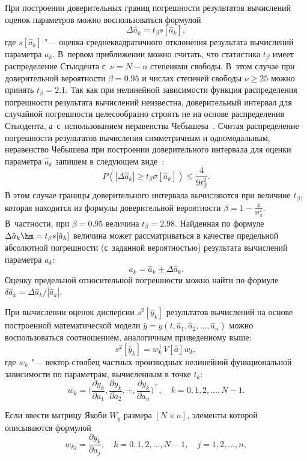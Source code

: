 При построении доверительных границ погрешности результатов вычислений оценок параметров   можно воспользоваться формулой 
$$\Delta\hat{a}_k=t_\beta s[\hat{a}_k],$$ 
где $s[\hat{a}_k]$ "--- оценка среднеквадратичного отклонения результата вычислений параметра $a_k$. 
В~первом приближении можно считать, что статистика $t_\beta$ имеет распределение Стьюдента с~$\nu=N-n$ степенями свободы. 
В~этом случае при доверительной вероятности $\beta=0.95$ и числах степеней свободы $\nu \geq 25$ можно принять $t_\beta=2.1$. 
Так как при нелинейной зависимости функция распределения погрешности результата вычислений неизвестна,  доверительный интервал для случайной погрешности целесообразно строить не на основе распределения Стьюдента, а~с~использованием неравенства Чебышева~\cite{zot:7}. 
Считая распределение погрешности результатов вычисления симметричным и одномодальным, неравенство Чебышева при построении доверительного интервала для оценки параметра $\hat{a}_k$ запишем в следующем виде~\cite{zot:7}: 
$$
P(|\Delta\hat{a}_k|\geq t_\beta \sigma[\hat{a}_k])\leq \dfrac{4}{9t_\beta^2}.
$$ 
В этом случае границы доверительного интервала вычисляются при величине $t_\beta$, которая находится из формулы доверительной вероятности $\beta=1-\frac{4}{9t_\beta^2}$. 
В~частности, при $\beta=0.95$ величина $t_\beta=2.98$. Найденная по формуле $\Delta\hat{a}_k \hm =t_\beta s[\hat{a}_k]$ величина может рассматриваться в качестве предельной абсолютной погрешности (с~заданной вероятностью) результата вычислений параметра $a_k$: 
$$a_k=\hat{a}_k\pm \Delta\hat{a}_k.$$ Оценку предельной относительной погрешности можно найти по формуле $\delta\hat{a}_k={\Delta \hat{a}_k}/{|\hat{a}_k|}.$

При вычислении оценок дисперсии $s^2[\hat{y}_k]$  результатов вычислений на основе построенной математической модели $\hat{y}=y(t,\hat{a}_1,\hat{a}_2,\dots,\hat{a}_n)$ можно воспользоваться соотношением, аналогичным приведенному выше: 
$$s^2[\hat{y}_k]=w_k^{\top}V[\hat{a}]w_k,$$ 
где $w_k$ "--- вектор-столбец частных производных нелинейной функциональной зависимости по параметрам, вычисленным в точке $t_k$:
$$w_k=\Big(\dfrac{\partial y_k}{\partial a_1},\dfrac{\partial y_k}{\partial a_2},\cdots,\dfrac{\partial y_k}{\partial a_n}\Big)^{\top},\quad k=0,1,2,\dots,N-1.$$



Если ввести матрицу Якоби $W_y$ размера $[N \times n]$, элементы которой описываются формулой 
$$
w_{kj}=\dfrac{\partial y_k}{\partial a_j},\quad k=0,1,2,\dots,N-1,\quad j=1,2,\dots,n,
$$ 



